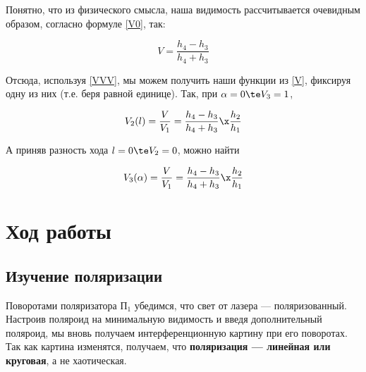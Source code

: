 \documentclass[12pt]{kiarticle} %
\begin{document}
Понятно, что из физического смысла, наша видимость рассчитывается очевидным образом, согласно формуле \eqref{V0}, так:

\begin{equation}\label{V}
V = \dfrac{h_4 - h_3}{h_4 + h_3}
\end{equation}

Отсюда, используя \eqref{VVV}, мы можем получить наши функции из \eqref{V}, фиксируя одну из них (т.е. беря равной единице). Так, при $ \alpha = 0 \te V_3 = 1 $, 

\begin{equation}\label{V2}
V_2 (l) = \dfrac{V}{V_1} = \dfrac{h_4 - h_3}{h_4 + h_3} \x \dfrac{h_2}{h_1}
\end{equation}

А приняв разность хода $ l = 0 \te V_2 = 0 $, можно найти 

\begin{equation}\label{V_3}
V_3(\alpha) = \dfrac{V}{V_1} = \dfrac{h_4 - h_3}{h_4 + h_3} \x \dfrac{h_2}{h_1}
\end{equation}

\section{Ход работы}


\subsection{Изучение поляризации}

Поворотами поляризатора $ П_1 $ убедимся, что свет от лазера --- поляризованный. Настроив поляроид на минимальную видимость и введя дополнительный поляроид, мы вновь получаем интерференционную картину при его поворотах. Так как картина изменятся, получаем, что \textbf{поляризация --- линейная или круговая}, а не хаотическая.
\end{document}

